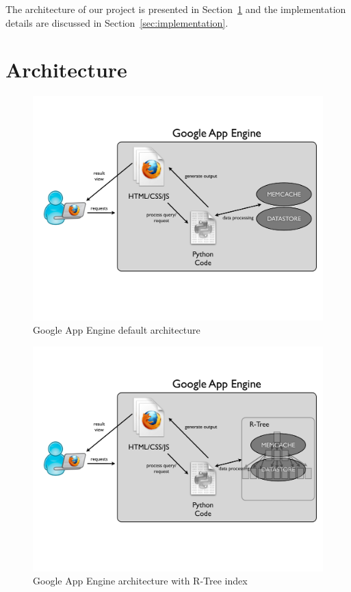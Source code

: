 \documentclass{scrartcl}
\begin{document}
The architecture of our project is presented in Section~\ref{sec:architecture} and the implementation details are discussed in Section~\ref{sec:implementation}. 

\section{Architecture}
\label{sec:architecture}
\begin{figure}[h!]
\begin{center}
\includegraphics[scale=0.3]{fig/gapps1}
\caption{Google App Engine default architecture}
\label{fig:gappsArch}
\end{center}
\end{figure}

\begin{figure}[h!]
\begin{center}
\includegraphics[scale=0.3]{fig/gapps2}
\caption{Google App Engine architecture with R-Tree index}
\label{fig:gappsArch2}
\end{center}
\end{figure}
\end{document}
